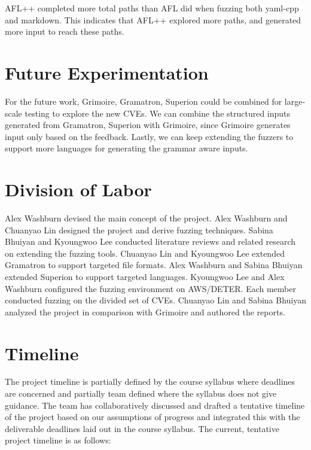 \documentclass[12pt]{diazessay}
\begin{document}
AFL++ completed more total paths than AFL did when fuzzing both yaml-cpp and markdown. This indicates that AFL++ explored more paths, and generated more input to reach these paths.


\section*{Future Experimentation}
For the future work, Grimoire, Gramatron, Superion could be combined for large-scale testing to explore the new CVEs. 
We can combine the structured inputs generated from Gramatron, Superion with Grimoire, since Grimoire generates input only based on the feedback.
Lastly, we can keep extending the fuzzers to support more languages for generating the grammar aware inputs.


\clearpage

\section*{Division of Labor}

Alex Washburn devised the main concept of the project.
Alex Washburn and Chuanyao Lin designed the project and derive fuzzing techniques.
Sabina Bhuiyan and Kyoungwoo Lee conducted literature reviews and related research on extending the fuzzing tools.
Chuanyao Lin and Kyoungwoo Lee extended Gramatron to support targeted file formats.
Alex Washburn and Sabina Bhuiyan extended Superion to support targeted languages.
Kyoungwoo Lee and Alex Washburn configured the fuzzing environment on AWS/DETER.
Each member conducted fuzzing on the divided set of CVEs.
Chuanyao Lin and Sabina Bhuiyan analyzed the project in comparison with Grimoire and authored the reports.


\section*{Timeline}

The project timeline is partially defined by the course syllabus where deadlines are concerned
and partially team defined where the syllabus does not give guidance.
The team has collaboratively discussed and drafted a tentative timeline of the project based on our assumptions of progress and integrated this with the deliverable deadlines laid out in the course syllabus. The current, tentative project timeline is as follows:
\end{document}
